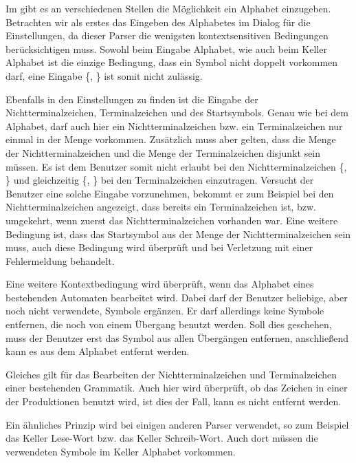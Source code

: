 Im \gtitool gibt es an verschiedenen Stellen die Möglichkeit ein Alphabet
einzugeben. Betrachten wir als erstes das Eingeben des Alphabetes im Dialog für
die Einstellungen, da dieser Parser die wenigsten kontextsensitiven Bedingungen
berücksichtigen muss. Sowohl beim Eingabe Alphabet, wie auch beim Keller
Alphabet ist die einzige Bedingung, dass ein Symbol nicht doppelt vorkommen
darf, eine Eingabe \{, \} ist somit nicht
zulässig.\vspace{10pt}

Ebenfalls in den Einstellungen zu finden ist die Eingabe der
Nichtterminalzeichen, Terminalzeichen und des Startsymbols. Genau wie bei dem
Alphabet, darf auch hier ein Nichtterminalzeichen bzw. ein Terminalzeichen nur
einmal in der Menge vorkommen. Zusätzlich muss aber gelten, dass die Menge der
Nichtterminalzeichen  und die Menge der Terminalzeichen disjunkt sein müssen. Es
ist dem Benutzer somit nicht erlaubt bei den Nichtterminalzeichen
\{, \} und gleichzeitig
\{, \} bei den Terminalzeichen einzutragen.
Versucht der Benutzer eine solche Eingabe vorzunehmen, bekommt er zum Beispiel
bei den Nichtterminalzeichen angezeigt, dass  bereits ein
Terminalzeichen ist, bzw. umgekehrt, wenn zuerst das Nichtterminalzeichen
vorhanden war. Eine weitere Bedingung ist, dass das Startsymbol aus der Menge der
Nichtterminalzeichen sein muss, auch diese Bedingung wird überprüft und bei
Verletzung mit einer Fehlermeldung behandelt.\vspace{10pt}

Eine weitere Kontextbedingung wird überprüft, wenn das Alphabet eines
bestehenden Automaten bearbeitet wird. Dabei darf der Benutzer beliebige, aber
noch nicht verwendete, Symbole ergänzen. Er darf allerdings keine Symbole
entfernen, die noch von einem Übergang benutzt werden. Soll dies geschehen,
muss der Benutzer erst das Symbol aus allen Übergängen entfernen,
anschließend kann es aus dem Alphabet entfernt werden.\vspace{10pt}

Gleiches gilt für das Bearbeiten der Nichtterminalzeichen und Terminalzeichen
einer bestehenden Grammatik. Auch hier wird überprüft, ob das Zeichen in einer
der Produktionen benutzt wird, ist dies der Fall, kann es nicht entfernt werden.

Ein ähnliches Prinzip wird bei einigen anderen Parser verwendet, so zum
Beispiel das Keller Lese-Wort bzw. das Keller Schreib-Wort. Auch dort müssen
die verwendeten Symbole im Keller Alphabet vorkommen.\vspace{10pt}



